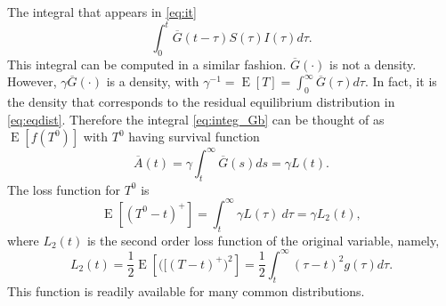 \documentclass[USenglish,10pt]{article}
\newcommand{\Ab}{\overline{A}\xspace}
\newcommand{\Gb}{\overline{G}\xspace}
\DeclareMathOperator{\Exp}{E}       %
\newcommand{\E}[1]{\Exp\left[{#1}\right]}       %
\begin{document}
The integral that appears in \eqref{eq:it}
\begin{equation}
	\int_0^t \Gb(t-\tau ) S(\tau)I(\tau)d\tau.
	\label{eq:integ_Gb}
\end{equation}
This integral can be computed in a similar fashion. $\Gb(\cdot)$  is not a density.
However, $\gamma\Gb(\cdot)$ is a density, with $\gamma^{-1}=\E{T}=\int_0^\infty\Gb(\tau)d\tau$.
In fact,  it is the density that corresponds to the residual equilibrium distribution in \eqref{eq:eqdist}. Therefore the integral \eqref{eq:integ_Gb} can be thought of as $\E{f(T^0)}$ with $T^0$ having survival function
\[ \Ab(t) = \gamma \int_t^\infty \Gb(s)ds = \gamma L(t).\]
The loss function for $T^0$ is
\[ \E{(T^0-t)^+} = \int_t^\infty \gamma L(\tau)\ d\tau  = \gamma L_2(t),\]
where $L_2(t)$ is the second order loss function of the original variable, namely,
\[ L_2(t) = \frac{1}{2} \E{\big([(T-t)^+\big)^2} = \frac{1}{2}\int_t^\infty (\tau-t)^2 g(\tau)d\tau. \]
This function is readily available for many common distributions.












\end{document}
